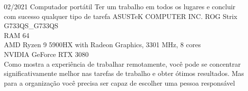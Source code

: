 

\begin{entrylist}
    \entry
    {02/2021}
    {Computador portátil}
    {Ter um trabalho em todos os lugares e concluir com sucesso qualquer tipo de tarefa}
    {
        ASUSTeK COMPUTER INC. ROG Strix G733QS\_G733QS             \\
        RAM 64                                                     \\
        AMD Ryzen 9 5900HX with Radeon Graphics, 3301 MHz, 8 cores \\
    NVIDIA GeForce RTX 3080                                    \\

    Como mostra a experiência de trabalhar remotamente, você pode se concentrar significativamente melhor nas tarefas de trabalho e obter ótimos resultados.
    Mas para a organização você precisa ser capaz de escolher uma pessoa responsável
    }
\end{entrylist}
